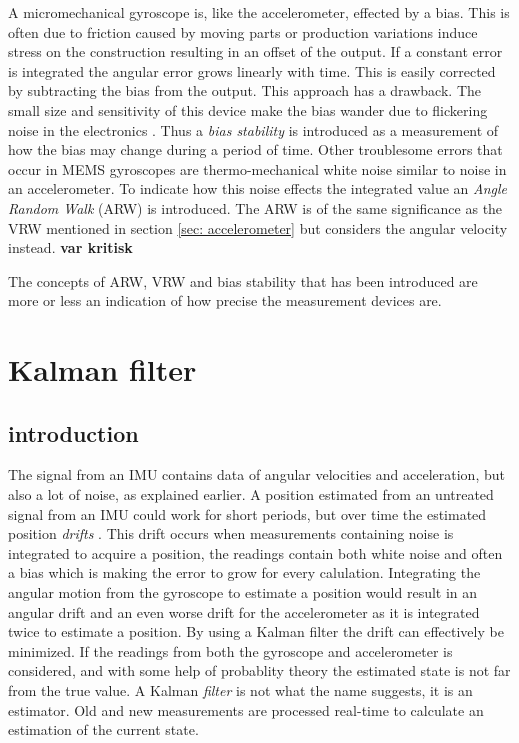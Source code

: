 \documentclass[a4paper,11pt]{kth-mag}
\begin{document}
A micromechanical gyroscope is, like the accelerometer, effected by a bias. This is often due to friction caused by moving parts or production variations induce stress on the construction resulting in an offset of the output. If a constant error is integrated the angular error grows linearly with time. This is easily corrected by subtracting the bias from the output.
This approach has a drawback. The small size and sensitivity of this device make the bias wander due to flickering noise in the electronics \cite{IMUintro}. Thus a \textit{bias stability} is introduced as a measurement of how the bias may change during a period of time.
Other troublesome errors that occur in MEMS gyroscopes are thermo-mechanical white noise similar to noise in an accelerometer. To indicate how this noise effects the integrated value an \textit{Angle Random Walk} (ARW) is introduced. The ARW is of the same significance as the VRW mentioned in section \ref{sec: accelerometer} but considers the angular velocity instead. \textbf{var kritisk} 

The concepts of ARW, VRW and bias stability that has been introduced are more or less an indication of how precise the measurement devices are.

\section{Kalman filter}
\subsection{introduction}
The signal from an IMU contains data of angular velocities and acceleration, but also a lot of noise, as explained earlier. A position estimated from an untreated signal from an IMU could work for short periods, but over time the estimated position \textit{drifts} \cite{MEMSdrift}. This drift occurs when measurements containing noise is integrated to acquire a position, the readings contain both white noise and often a bias which is making the  error to grow for every calulation.
Integrating the angular motion from the gyroscope to estimate a position would result in an angular drift and an even worse drift for the accelerometer as it is integrated twice to estimate a position.
By using a Kalman filter the drift can effectively be minimized. If the readings from both the gyroscope and accelerometer is considered, and with some help of probablity theory the estimated state is not far from the true value.  A Kalman \textit{filter} is not what the name suggests, it is an estimator. Old and new measurements are processed real-time to calculate an estimation of the current state. 
\end{document}
